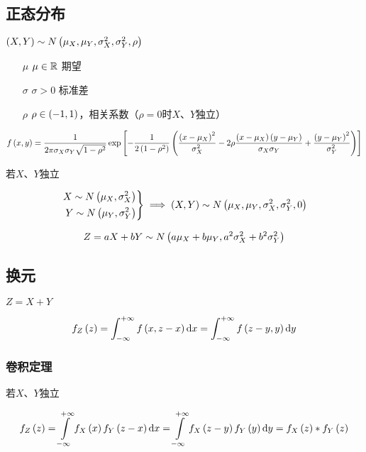 \documentclass{article}
\begin{document}
\subsection{正态分布}

$\left(X,Y\right)\sim N\left(\mu_X,\mu_Y,\sigma_X^2,\sigma_Y^2,\rho\right)$

\begin{enumerate}
    \item [$\mu$] $\mu\in\mathbb R$ 期望
    \item [$\sigma$] $\sigma>0$ 标准差
    \item [$\rho$] $\rho\in\left(-1,1\right)$，相关系数（$\rho=0$时$X$、$Y$独立）
\end{enumerate}

\[f\left(x,y\right)=\frac1{2\pi\sigma_X\sigma_Y\sqrt{1-\rho^2}}
    \exp\left[-\frac1{2\left(1-\rho^2\right)}
        \left(\frac{{\left(x-\mu_X\right)}^2}{\sigma_X^2}
            -2\rho\frac{\left(x-\mu_X\right)\left(y-\mu_Y\right)}{\sigma_X\sigma_Y}
            +\frac{{\left(y-\mu_Y\right)}^2}{\sigma_Y^2}\right)\right]\]

若$X$、$Y$独立

\[\left.\begin{aligned}
        X\sim N\left(\mu_X,\sigma_X^2\right) \\
        Y\sim N\left(\mu_Y,\sigma_Y^2\right)
    \end{aligned}\right\}\implies
    \left(X,Y\right)\sim N\left(\mu_X,\mu_Y,\sigma_X^2,\sigma_Y^2,0\right)\]


\[Z=aX+bY\sim N\left(a\mu_X+b\mu_Y,a^2\sigma_X^2+b^2\sigma_Y^2\right)\]

\subsection{换元}

$Z=X+Y$

\[f_Z\left(z\right)
    =\int_{-\infty}^{+\infty}f\left(x,z-x\right)\mathrm d x
    =\int_{-\infty}^{+\infty}f\left(z-y,y\right)\mathrm d y\]

\subsubsection{卷积定理}

若$X$、$Y$独立

\[f_Z\left(z\right)
=\int\limits_{-\infty}^{+\infty}f_X\left(x\right)f_Y\left(z-x\right)\mathrm d x
=\int\limits_{-\infty}^{+\infty}f_X\left(z-y\right)f_Y\left(y\right)\mathrm d y
=f_X\left(z\right)\ast f_Y\left(z\right)\]
\end{document}
